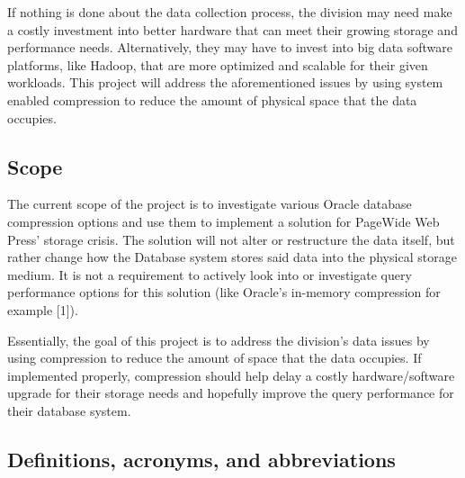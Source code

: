 \documentclass[10pt]{article}
\begin{document}
If nothing is done about the data collection process, the division may need make a costly investment into better hardware that can meet their growing storage and performance needs. Alternatively, they may have to invest into big data software platforms, like Hadoop, that are more optimized and scalable for their given workloads. This project will address the aforementioned issues by using system enabled compression to reduce the amount of physical space that the data occupies.


\subsection{Scope}

The current scope of the project is to investigate various Oracle database compression options and use them to implement a solution for PageWide Web Press' storage crisis. The solution will not alter or restructure the data itself, but rather change how the Database system stores said data into the physical storage medium. It is not a requirement to actively look into or investigate query performance options for this solution (like Oracle's in-memory compression for example [1]).

Essentially, the goal of this project is to address the division's data issues by using compression to reduce the amount of space that the data occupies. If implemented properly, compression should help delay a costly hardware/software upgrade for their storage needs and hopefully improve the query performance for their database system.


\subsection{Definitions, acronyms, and abbreviations}
\end{document}
